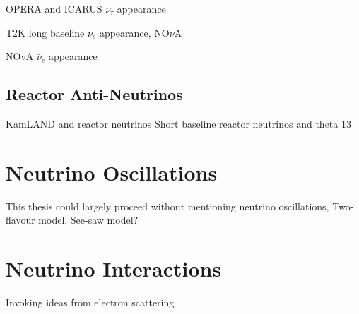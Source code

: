 OPERA and ICARUS $\nu_\tau$ appearance

T2K long baseline $\nu_e$ appearance, NO$\nu$A

NOvA $\bar{\nu}_e$ appearance

\subsection{Reactor Anti-Neutrinos}
KamLAND and reactor neutrinos
Short baseline reactor neutrinos and theta 13

\section{Neutrino Oscillations}
\label{sec:theory:osc}
This thesis could largely proceed without mentioning neutrino oscillations, Two-flavour model, See-saw model?

\section{Neutrino Interactions}
\label{sec:theory:int}
Invoking ideas from electron scattering